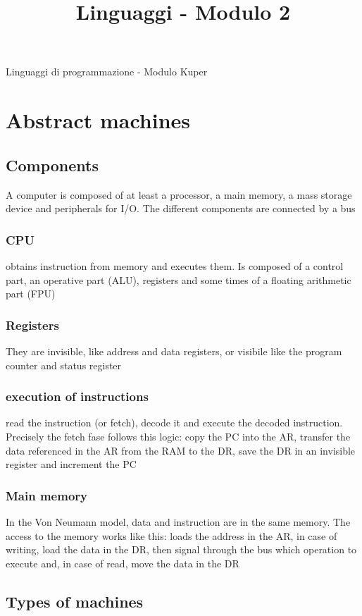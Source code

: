 \documentclass[12pt, a4paper]{article}
\title{Linguaggi - Modulo 2}
\begin{document}
Linguaggi di programmazione - Modulo Kuper

\section{Abstract machines}

\subsection{Components}
A computer is composed of at least a processor, a main memory, a mass storage device and peripherals for I/O.
The different components are connected by a bus

\subsubsection{CPU}
obtains instruction from memory and executes them. Is composed of a control part, an operative part (ALU), registers
and some times of a floating arithmetic part (FPU)

\subsubsection{Registers}
They are invisible, like address and data registers, or visibile like the program counter and status register

\subsubsection{execution of instructions}
read the instruction (or fetch), decode it and execute the decoded instruction. Precisely the fetch fase follows this
logic: copy the PC into the AR, transfer the data referenced in the AR from the RAM to the DR, save the DR in an
invisible register and increment the PC

\subsubsection{Main memory}
In the Von Neumann model, data and instruction are in the same memory. The access to the memory works like this:
loads the address in the AR, in case of writing, load the data in the DR, then signal through the bus which operation
to execute and, in case of read, move the data in the DR

\subsection{Types of machines}
\end{document}
